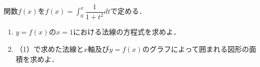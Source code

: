 \documentclass[../../main.tex]{subfiles}
\begin{document}
関数$f(x)$を${\displaystyle f(x)=\int_0^x\dfrac{1}{1+t^2} dt}$で定める．
\begin{enumerate}
  \item $y=f(x)$の$x=1$における法線の方程式を求めよ．
  \item （1）で求めた法線と$x$軸及び$y=f(x)$のグラフによって囲まれる図形の面積を求めよ．
\end{enumerate}
\end{document}

